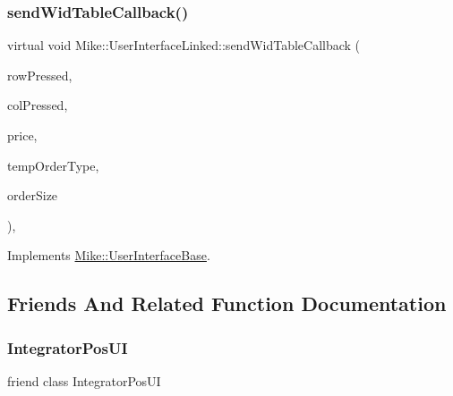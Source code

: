 \mbox{\label{class_mike_1_1_user_interface_linked_a687ab0f108f97cae19ee81688a45476a}} 
\subsubsection{\texorpdfstring{send\+Wid\+Table\+Callback()}{sendWidTableCallback()}}
{\footnotesize\ttfamily virtual void Mike\+::\+User\+Interface\+Linked\+::send\+Wid\+Table\+Callback (\begin{DoxyParamCaption}\item[{int}]{row\+Pressed,  }\item[{int}]{col\+Pressed,  }\item[{long}]{price,  }\item[{\hyperlink{namespace_mike_aa486aea8b1d0d07190982a311394e6cb}{Mike\+Order\+Type}}]{temp\+Order\+Type,  }\item[{int}]{order\+Size }\end{DoxyParamCaption})\hspace{0.3cm}{\ttfamily [private]}, {\ttfamily [virtual]}}



Implements \hyperlink{class_mike_1_1_user_interface_base_a42469ffe57a8528064068a84e277ee6a}{Mike\+::\+User\+Interface\+Base}.



\subsection{Friends And Related Function Documentation}
\mbox{\label{class_mike_1_1_user_interface_linked_aa68f3dbce9d9f381bea2f56fda8bfb6b}} 
\subsubsection{\texorpdfstring{Integrator\+Pos\+UI}{IntegratorPosUI}}
{\footnotesize\ttfamily friend class Integrator\+Pos\+UI\hspace{0.3cm}{\ttfamily [friend]}}




